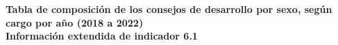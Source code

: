 {\color{color3}\LARGE\textbf{Tabla de composición de los consejos de desarrollo por sexo, según cargo por año (2018 a 2022)}} \\[0.5cm]
{\color{color2}\large \textbf{Información extendida de indicador 6.1}}
\begin{table}[h]
	
\end{table}
\clearpage
\begin{table}[h]
	
\end{table}
\clearpage
\begin{table}[h]

\end{table}